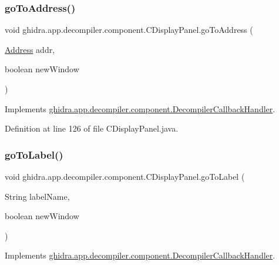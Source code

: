 \subsubsection{\texorpdfstring{goToAddress()}{goToAddress()}}
{\footnotesize\ttfamily void ghidra.\+app.\+decompiler.\+component.\+C\+Display\+Panel.\+go\+To\+Address (\begin{DoxyParamCaption}\item[{\mbox{\hyperlink{class_address}{Address}}}]{addr,  }\item[{boolean}]{new\+Window }\end{DoxyParamCaption})\hspace{0.3cm}{\ttfamily [inline]}}



Implements \mbox{\hyperlink{interfaceghidra_1_1app_1_1decompiler_1_1component_1_1_decompiler_callback_handler_a83ea9c0c73ddd58a0d44de4490752a6c}{ghidra.\+app.\+decompiler.\+component.\+Decompiler\+Callback\+Handler}}.



Definition at line 126 of file C\+Display\+Panel.\+java.

\mbox{\label{classghidra_1_1app_1_1decompiler_1_1component_1_1_c_display_panel_a42edf09645141abad7ba592cab6b2e50}} 
\subsubsection{\texorpdfstring{goToLabel()}{goToLabel()}}
{\footnotesize\ttfamily void ghidra.\+app.\+decompiler.\+component.\+C\+Display\+Panel.\+go\+To\+Label (\begin{DoxyParamCaption}\item[{String}]{label\+Name,  }\item[{boolean}]{new\+Window }\end{DoxyParamCaption})\hspace{0.3cm}{\ttfamily [inline]}}



Implements \mbox{\hyperlink{interfaceghidra_1_1app_1_1decompiler_1_1component_1_1_decompiler_callback_handler_ac730fdb08d3f3ac4454d34b42cfe3d2b}{ghidra.\+app.\+decompiler.\+component.\+Decompiler\+Callback\+Handler}}.



